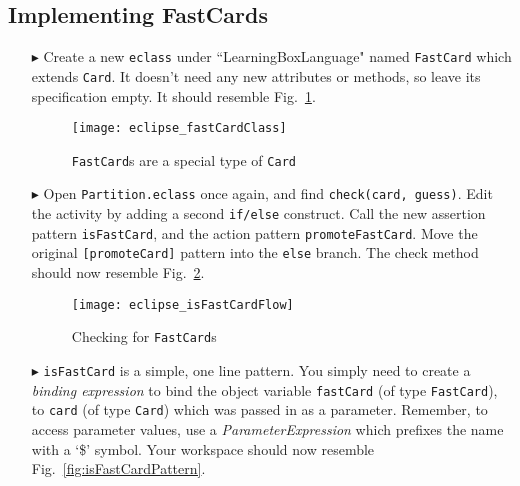 \newpage
\subsection{Implementing FastCards}
\texHeader
\hypertarget{fastCard tex}{}

\begin{itemize}
  
\item[$\blacktriangleright$] Create a new \texttt{eclass} under ``LearningBoxLanguage" named \texttt{FastCard} which extends \texttt{Card}. It doesn't need any
new attributes or methods, so leave its specification empty. It should resemble Fig.~\ref{fig:fastClass}.

\vspace{0.5cm}

\begin{figure}[htp]
\begin{center}
  \texttt{[image: eclipse\_fastCardClass]}
  \caption{\texttt{FastCard}s are a special type of \texttt{Card}}
  \label{fig:fastClass}
\end{center}
\end{figure}

\item[$\blacktriangleright$] Open \texttt{Partition.eclass} once again, and find \texttt{check(card, guess)}. Edit the activity by adding a second
\texttt{if/else} construct. Call the new assertion pattern \texttt{isFastCard}, and the action pattern \texttt{promoteFastCard}. Move the original
\texttt{[promoteCard]} pattern into the \texttt{else} branch. The check method should now resemble Fig.~\ref{fig:isFastCard}.

\vspace{0.5cm}

\begin{figure}[htp]
\begin{center}
  \texttt{[image: eclipse\_isFastCardFlow]}
  \caption{Checking for \texttt{FastCard}s}
  \label{fig:isFastCard}
\end{center}
\end{figure}

\item[$\blacktriangleright$] \texttt{isFastCard} is a simple, one line pattern. You simply need to create a \emph{binding expression} to bind the
object variable \texttt{fastCard} (of type \texttt{FastCard}), to \texttt{card} (of type \texttt{Card}) which was passed in as a parameter. Remember, to access
parameter values, use a \emph{ParameterExpression} which prefixes the name with a `\$' symbol. Your workspace should now resemble
Fig.~\ref{fig:isFastCardPattern}.


\end{itemize}
